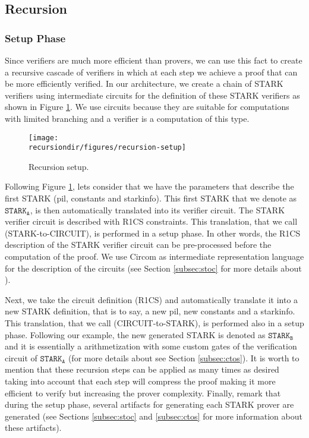 
\subsection{Recursion}

\subsubsection{Setup Phase}

Since verifiers are much more efficient than provers, we can use this fact to create a recursive cascade of verifiers in which at each step we achieve a proof that can be more efficiently verified.
In our architecture, we create a chain of STARK verifiers using intermediate circuits for the definition of these STARK verifiers as shown in Figure \ref{fig:recursion-setup}.
We use circuits because they are suitable for computations with limited branching and a verifier is a computation of this type.

\begin{figure}[H]
\centering
\texttt{[image: \\recursiondir/figures/recursion-setup]}
\caption{Recursion setup.}
\label{fig:recursion-setup}
\end{figure}

Following Figure \ref{fig:recursion-setup}, lets consider that 
we have the parameters that describe the first STARK (pil, constants and starkinfo).
This first STARK that we denote as $\texttt{STARK}_{\texttt{A}}$, is then automatically translated into its verifier circuit. 
The STARK verifier circuit is described with R1CS constraints.
This translation, that we call \stoc (STARK-to-CIRCUIT), is performed in a setup phase. In other words, the R1CS description of the STARK verifier circuit can be pre-processed before the computation of the proof. 
We use Circom as intermediate representation language for the description of the circuits (see Section \ref{subsec:stoc} for more details about \stoc).

Next, we take the circuit definition (R1CS) and automatically translate it into a new STARK definition, that is to say, a new pil, new constants and a starkinfo.
This translation, that we call \ctos (CIRCUIT-to-STARK), 
is performed also in a setup phase.
Following our example, the new generated STARK is denoted as
$\texttt{STARK}_{\texttt{B}}$ and it is essentially a  arithmetization with some custom gates of the verification circuit of $\texttt{STARK}_{\texttt{A}}$
(for more details about \stoc see Section \ref{subsec:ctos}).
It is worth to mention that these recursion steps can be applied as many times as desired taking into account that each step will compress the proof making it
more efficient to verify but increasing the prover complexity.
Finally, remark that during the setup phase, several artifacts for generating each STARK prover are generated (see Sections \ref{subsec:stoc} and \ref{subsec:ctos} for more information 
about these artifacts). 

